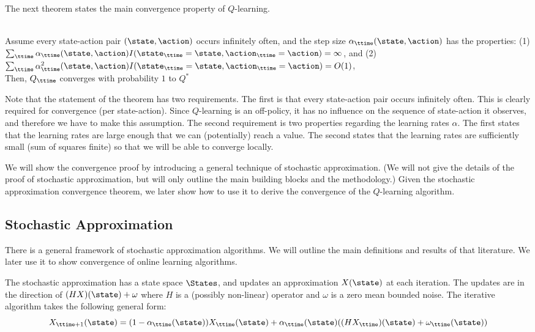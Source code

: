 The next theorem states the main convergence property of
$Q$-learning.
\begin{theorem}\ \\
\label{thm:Q-learning} Assume every state-action pair
$(\state,\action)$ occurs infinitely often, and the step size
$\alpha_\ttime(\state,\action)$ has the properties: (1) $\sum_\ttime
\alpha_\ttime(\state,\action)
I(\state_\ttime=\state,\action_\ttime=\action)=\infty $, and (2)
$\sum_\ttime
\alpha_\ttime^2(\state,\action) I(\state_\ttime=\state,\action_\ttime=\action)=O(1)$,\\
Then, $Q_\ttime$ converges with probability $1$ to $Q^*$
\end{theorem}

Note that the statement of the theorem has two requirements. The
first is that every state-action pair occurs infinitely often.
This is clearly required for convergence (per state-action). Since
$Q$-learning is an off-policy, it has no influence on the sequence
of state-action it observes, and therefore we have to make this
assumption. The second requirement is two properties regarding the
learning rates $\alpha$. The first states that the learning rates
are large enough that we can (potentially) reach a value. The
second states that the learning rates are sufficiently small (sum of
squares finite) so that we will be able to converge locally.

We will show the convergence proof by introducing a general technique
of stochastic approximation. (We will not give the details of the
proof of stochastic approximation, but will only outline the main
building blocks and the methodology.) Given the stochastic
approximation convergence theorem, we later show how to use it to
derive the convergence of the $Q$-learning algorithm.


\subsection{Stochastic Approximation}
\label{sec:stochastic-approximation}

There is a general framework of stochastic approximation algorithms.
We will outline the main definitions and results of that literature.
We later use it to show convergence of online learning algorithms.

The stochastic approximation has a state space $\States$, and
updates an approximation $X(\state)$ at each iteration. The updates
are in the direction of $(HX)(\state)+\omega$ where $H$ is a (possibly
non-linear) operator and $\omega$ is a zero mean bounded noise. The
iterative algorithm takes the following general form:
\[
X_{\ttime+1}(\state) =
(1-\alpha_\ttime(\state))X_\ttime(\state)+\alpha_\ttime(\state)((HX_\ttime)(\state)+\omega_\ttime(\state))
\]

